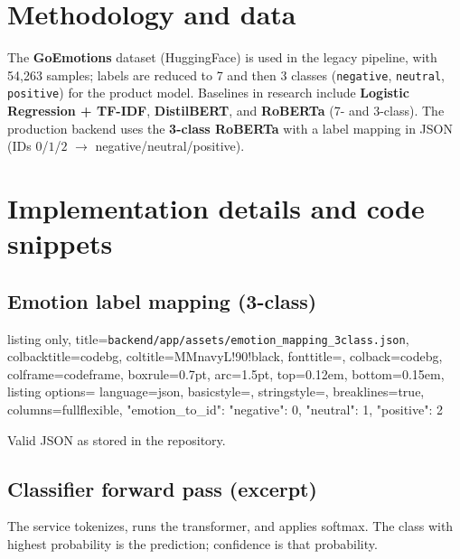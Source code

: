 \documentclass[11pt,a4paper]{article}
\begin{document}
\section{Methodology and data}
The \textbf{GoEmotions} dataset (HuggingFace) is used in the legacy pipeline, with 54{,}263 samples; labels are reduced to 7 and then 3 classes (\texttt{negative}, \texttt{neutral}, \texttt{positive}) for the product model. Baselines in research include \textbf{Logistic Regression + TF-IDF}, \textbf{DistilBERT}, and \textbf{RoBERTa} (7- and 3-class). The production backend uses the \textbf{3-class RoBERTa} with a label mapping in JSON (IDs $0$/$1$/$2$ $\rightarrow$ negative/neutral/positive).

\section{Implementation details and code snippets}
\label{sec:impl}

\subsection{Emotion label mapping (3-class)}
\begin{tcblisting}{
  listing only,
  title={\texttt{backend/app/assets/emotion\_mapping\_3class.json}},
  colbacktitle=codebg,
  coltitle=MMnavyL!90!black,
  fonttitle=\ttfamily\footnotesize,
  colback=codebg,
  colframe=codeframe,
  boxrule=0.7pt,
  arc=1.5pt,
  top=0.12em, bottom=0.15em,
  listing options={
    language=json,
    basicstyle=\ttfamily\footnotesize,
    stringstyle=\color{str},
    breaklines=true,
    columns=fullflexible,
  }
}
{
  "emotion_to_id": {
    "negative": 0,
    "neutral": 1,
    "positive": 2
  }
}
\end{tcblisting}
\noindent\small\color{MMnavyL!80!black} Valid JSON as stored in the repository.

\subsection{Classifier forward pass (excerpt)}
The service tokenizes, runs the transformer, and applies softmax. The class with highest probability is the prediction; confidence is that probability.
\end{document}
